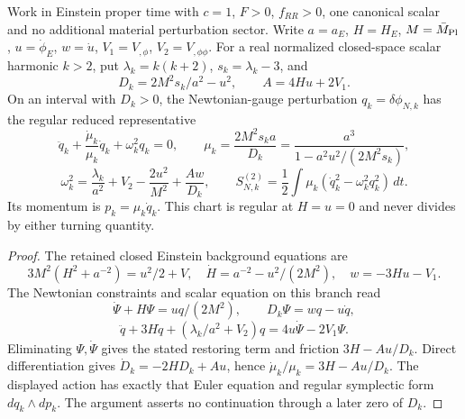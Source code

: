 \documentclass[12pt,a4paper]{article}
\begin{document}
\begin{theorem}
\label{p8:thm:v2109-regular-root-scalar}
Work in Einstein proper time with \(c=1\), \(F>0\), \(f_{RR}>0\), one
canonical scalar and no additional material perturbation sector.  Write
\(a=a_E\), \(H=H_E\), \(M=\bar M_{\rm Pl}\), \(u=\dot\phi_E\),
\(w=\dot u\), \(V_1=V_{,\phi}\), \(V_2=V_{,\phi\phi}\).
For a real normalized closed-space scalar harmonic \(k>2\), put
\(\lambda_k=k(k+2)\), \(s_k=\lambda_k-3\), and
\[
 D_k=2M^2s_k/a^2-u^2,\qquad A=4Hu+2V_1.
\]
On an interval with \(D_k>0\), the Newtonian-gauge perturbation
\(q_k=\delta\phi_{N,k}\) has the regular reduced representative
\[
 \ddot q_k+\frac{\dot\mu_k}{\mu_k}\dot q_k+\omega_k^2q_k=0,
 \qquad \mu_k=\frac{2M^2s_ka}{D_k}
 =\frac{a^3}{1-a^2u^2/(2M^2s_k)},
\]
\[
 \omega_k^2=\frac{\lambda_k}{a^2}+V_2-\frac{2u^2}{M^2}
                   +\frac{Aw}{D_k},\qquad
 S_{N,k}^{(2)}=\frac12\int\mu_k(\dot q_k^2-\omega_k^2q_k^2)\,dt.
\]
Its momentum is \(p_k=\mu_k\dot q_k\).  This chart is regular at
\(H=u=0\) and never divides by either turning quantity.
\end{theorem}
\begin{proof}
The retained closed Einstein background equations are
\[
 3M^2(H^2+a^{-2})=u^2/2+V,\quad
 \dot H=a^{-2}-u^2/(2M^2),\quad w=-3Hu-V_1.
\]
The Newtonian constraints and scalar equation on this branch read
\[
 \dot\Psi+H\Psi=uq/(2M^2),\qquad
 D_k\Psi=wq-u\dot q,
\]
\[
 \ddot q+3H\dot q+(\lambda_k/a^2+V_2)q
       =4u\dot\Psi-2V_1\Psi.
\]
Eliminating \(\Psi,\dot\Psi\) gives the stated restoring term and
friction \(3H-Au/D_k\).  Direct differentiation gives
\(\dot D_k=-2HD_k+Au\), hence
\(\dot\mu_k/\mu_k=3H-Au/D_k\).  The displayed action has exactly that
Euler equation and regular symplectic form \(dq_k\wedge dp_k\).
The argument asserts no continuation through a later zero of \(D_k\).
\end{proof}
\end{document}
